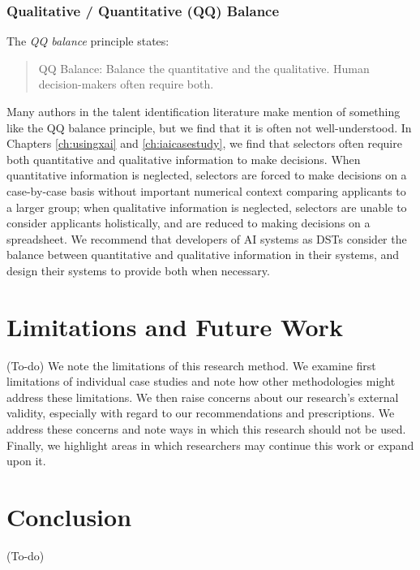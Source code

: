 \subsubsection{Qualitative / Quantitative (QQ) Balance}
The \emph{QQ balance} principle states:

\begin{quote}
    QQ Balance: Balance the quantitative and the qualitative. Human decision-makers often require both.
\end{quote}

Many authors in the talent identification literature make mention of something like the QQ balance principle, but we find that it is often not well-understood. In Chapters \ref{ch:usingxai} and \ref{ch:iaicasestudy}, we find that selectors often require both quantitative and qualitative information to make decisions. When quantitative information is neglected, selectors are forced to make decisions on a case-by-case basis without important numerical context comparing applicants to a larger group; when qualitative information is neglected, selectors are unable to consider applicants holistically, and are reduced to making decisions on a spreadsheet. We recommend that developers of AI systems as DSTs consider the balance between quantitative and qualitative information in their systems, and design their systems to provide both when necessary.

\section{Limitations and Future Work}
(To-do) We note the limitations of this research method. We examine first limitations of individual case studies and note how other methodologies might address these limitations. We then raise concerns about our research's external validity, especially with regard to our recommendations and prescriptions. We address these concerns and note ways in which this research should not be used. Finally, we highlight areas in which researchers may continue this work or expand upon it.

\section{Conclusion}
(To-do)